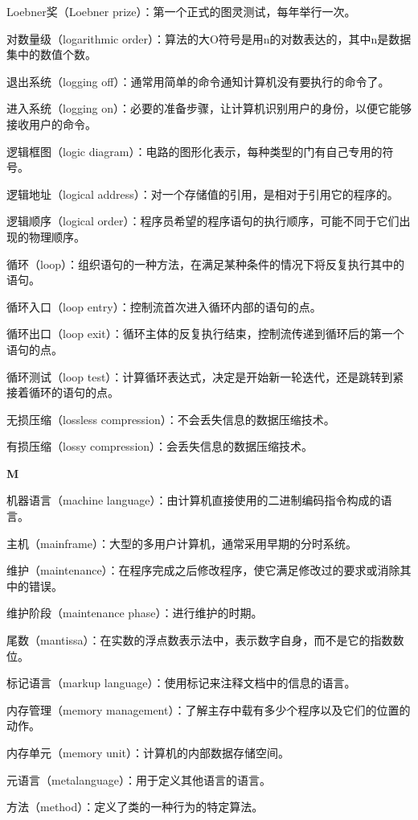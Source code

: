 Loebner奖（Loebner prize）：第一个正式的图灵测试，每年举行一次。

对数量级（logarithmic order）：算法的大O符号是用n的对数表达的，其中n是数据集中的数值个数。

退出系统（logging off）：通常用简单的命令通知计算机没有要执行的命令了。

进入系统（logging on）：必要的准备步骤，让计算机识别用户的身份，以便它能够接收用户的命令。

逻辑框图（logic diagram）：电路的图形化表示，每种类型的门有自己专用的符号。

逻辑地址（logical address）：对一个存储值的引用，是相对于引用它的程序的。

逻辑顺序（logical order）：程序员希望的程序语句的执行顺序，可能不同于它们出现的物理顺序。

循环（loop）：组织语句的一种方法，在满足某种条件的情况下将反复执行其中的语句。

循环入口（loop entry）：控制流首次进入循环内部的语句的点。

循环出口（loop exit）：循环主体的反复执行结束，控制流传递到循环后的第一个语句的点。

循环测试（loop test）：计算循环表达式，决定是开始新一轮迭代，还是跳转到紧接着循环的语句的点。

无损压缩（lossless compression）：不会丢失信息的数据压缩技术。

有损压缩（lossy compression）：会丢失信息的数据压缩技术。

\textbf{M}

机器语言（machine language）：由计算机直接使用的二进制编码指令构成的语言。

主机（mainframe）：大型的多用户计算机，通常采用早期的分时系统。

维护（maintenance）：在程序完成之后修改程序，使它满足修改过的要求或消除其中的错误。

维护阶段（maintenance phase）：进行维护的时期。

尾数（mantissa）：在实数的浮点数表示法中，表示数字自身，而不是它的指数数位。

标记语言（markup language）：使用标记来注释文档中的信息的语言。

内存管理（memory management）：了解主存中载有多少个程序以及它们的位置的动作。

内存单元（memory unit）：计算机的内部数据存储空间。

元语言（metalanguage）：用于定义其他语言的语言。

方法（method）：定义了类的一种行为的特定算法。

